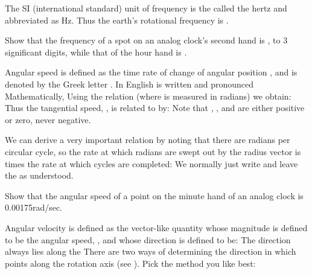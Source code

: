 {The SI (international standard) unit of frequency is the  called the hertz and abbreviated as Hz.
Thus the earth's rotational frequency is .

\tryit Show that the frequency of a spot on an analog clock's second hand is
, to 3 significant digits, while that of the hour hand is
. 

Angular speed is defined as the time rate of change of
angular position
\m{\theta}, and is denoted by the Greek letter \m{\omega}.
In English \m{\omega} is written  and pronounced 
Mathematically,
%
%
Using the relation  (where \m{\theta} is measured in
radians) we obtain:
%
%
Thus the tangential speed, , is related to \m{\omega} by:
%
%
Note that , \m{\omega}, and  are either positive or zero, never
negative.

We can derive a very important relation by noting that there are \m{2 \pi}
radians per circular cycle, so the rate at which radians are swept out by
the radius vector is \m{2 \pi} times the rate at which cycles are completed:
%
%
We normally just write \Quote{\m{\omega = 2 \pi \nu}} and leave the
 as understood.

\tryit Show that the angular speed of a point on the minute hand of an
analog clock is 0.00175\unit{rad/sec}. 


Angular velocity is defined as the vector-like quantity \vect{\omega} whose
magnitude is defined to be the angular speed, \m{\omega}, and whose direction
is defined to be: 
%
%
The direction \m{\uvec{\omega}} always lies along the 
There are two ways of determining the direction in which \m{\uvec{\omega}}
points along the rotation axis (see ).
Pick the method you like best:

}
